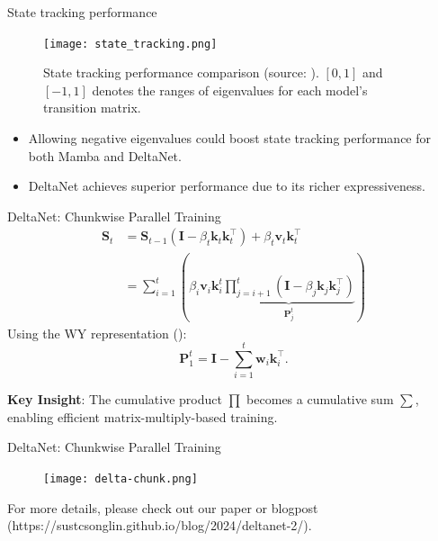     

\begin{frame}{State tracking performance}
    \begin{figure}
        \centering
        \texttt{[image: state\_tracking.png]}
        \caption{State tracking performance comparison (source: \cite{Grazzi2024UnlockingSI}). $[0,1]$ and $[-1,1]$ denotes the ranges of eigenvalues for each model's transition matrix.}
    \end{figure}
    \vspace{-5mm}
   \begin{itemize}
    \item {\color{red}Allowing negative eigenvalues} could boost state tracking performance for both Mamba and DeltaNet.
    \item DeltaNet achieves superior performance due to its {\color{red}richer expressiveness}.
   \end{itemize}
\end{frame}

\begin{frame}{DeltaNet: Chunkwise Parallel Training}
    \begin{align*}
        \mathbf{S}_t &= \mathbf{S}_{t-1} \left(\mathbf{I} - \beta_t \mathbf{k}_t \mathbf{k}_t^\top\right) + \beta_t \mathbf{v}_t \mathbf{k}_t^\top \\
        &= \sum_{i=1}^{t} \left(\beta_i \mathbf{v}_i \mathbf{k}_i^t \underbrace{\prod_{j=i+1}^{t} (\mathbf{I} - \beta_j \mathbf{k}_j \mathbf{k}_j^\top)}_{\mathbf{P}_j^t}\right)
    \end{align*}
    Using the WY representation (\cite{bischof_wy_1985}):
    \[
    \mathbf{P}_{1}^t = \mathbf{I} - \sum_{i=1}^{t}\mathbf{w}_{i}\mathbf{k}_{i}^{\top}.
    \]
    
    {\color{red}\textbf{Key Insight}}: The cumulative product $\prod$ becomes a cumulative sum $\sum$, enabling efficient matrix-multiply-based training.
    \end{frame}

\begin{frame}{DeltaNet: Chunkwise Parallel Training}

    \begin{figure}
        \centering
        \texttt{[image: delta-chunk.png]}
    \end{figure}
    \small
    \vspace{-5mm}
    For more details, please check out our paper or blogpost (https://sustcsonglin.github.io/blog/2024/deltanet-2/).

\end{frame}

